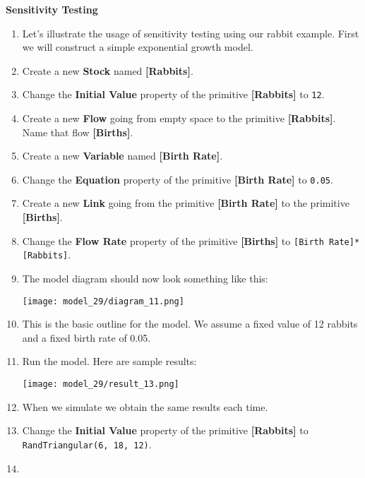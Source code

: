 \documentclass[]{memoir}
\makeatletter
\def\maxwidth{\ifdim\Gin@nat@width>\linewidth\linewidth
\else\Gin@nat@width\fi}
\let\Oldincludegraphics\includegraphics
\renewcommand{\includegraphics}[1]{\Oldincludegraphics[width=\maxwidth]{#1}}
\newcommand{\p}[1]{\textbf{{[}#1{]}}}
\newcommand{\e}[1]{\texttt{#1}}
\renewcommand{\a}[1]{\textbf{#1}}
\makeatother
\begin{document}
\FloatBarrier 

\begin{oframed}\textbf{Sensitivity Testing} 

 \begin{enumerate}
\item 

Let's illustrate the usage of sensitivity testing using our rabbit example. First we will construct a simple exponential growth model.


\item Create a new \a{Stock} named \p{Rabbits}.
\item  Change the \a{Initial Value} property of the primitive \p{Rabbits} to \e{12}.
\item Create a new \a{Flow} going from empty space to the primitive \p{Rabbits}. Name that flow \p{Births}.
\item Create a new \a{Variable} named \p{Birth Rate}.
\item  Change the \a{Equation} property of the primitive \p{Birth Rate} to \e{0.05}.
\item Create a new \a{Link} going from the primitive \p{Birth Rate} to the primitive \p{Births}.
\item  Change the \a{Flow Rate} property of the primitive \p{Births} to \e{[Birth Rate]*[Rabbits]}.
\item The model diagram should now look something like this: \par \begin{minipage}{\linewidth}  \centering \texttt{[image: model\_29/diagram\_11.png]}
\end{minipage}
\item 

This is the basic outline for the model. We assume a fixed value of 12 rabbits and a fixed birth rate of 0.05.


\item Run the model. Here are sample results:\par \begin{minipage}{\linewidth}  \centering \texttt{[image: model\_29/result\_13.png]}
\end{minipage}
\item 

When we simulate we obtain the same results each time.


\item  Change the \a{Initial Value} property of the primitive \p{Rabbits} to \e{RandTriangular(6, 18, 12)}.
\item 


\end{enumerate}
\end{oframed}
\end{document}
